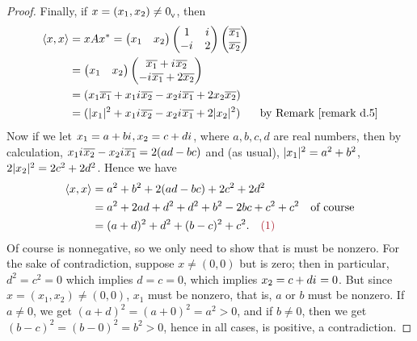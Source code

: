 \begin{proof}
Finally, if \(x = (x_1, x_2) \ne 0_{_{\textsf{V}}}\), then
\begin{align*}
    \LG x, x \RG & = x A x^*
        = \begin{pmatrix} x_1 & x_2 \end{pmatrix}
          \begin{pmatrix} 1 & \iu \\ -\iu & 2 \end{pmatrix}
          \begin{pmatrix} \conjugatet{x_1} \\ \conjugatet{x_2} \end{pmatrix} \\
        & = \begin{pmatrix} x_1 & x_2 \end{pmatrix}
            \begin{pmatrix} \conjugatet{x_1} + \iu \conjugatet{x_2} \\ -\iu \conjugatet{x_1} + 2\conjugatet{x_2} \end{pmatrix} \\
        & = (x_1 \conjugatet{x_1} + x_1 \iu \conjugatet{x_2} - x_2 \iu \conjugatet{x_1} + 2 x_2 \conjugatet{x_2}) \\
        & = (\abs{x_1}^2 + x_1 \iu \conjugatet{x_2} - x_2 \iu \conjugatet{x_1} + 2 \abs{x_2}^2) & \text{by \RMK{d.5}}
\end{align*}
Now if we let \(x_1 = a + b {i\mkern1mu}, x_2 = c + d {i\mkern1mu}\), where \(a, b, c, d\) are real numbers, then by calculation, \(x_1 {i\mkern1mu} \overline{x_2} - x_2 {i\mkern1mu} \overline{x_1} = 2(ad - bc)\) and (as usual), \(\lvert x_1\rvert^2 = a^2 + b^2\), \(2 \lvert x_2\rvert^2 = 2c^2 + 2d^2\).
Hence we have
\begin{align*}
    \LG x, x \RG & = a^2 + b^2 + 2(ad - bc) + 2c^2 + 2d^2 \\
        & = a^2 + 2ad + d^2 + d^2 + b^2 - 2bc + c^2 + c^2 & \text{of course} \\
        & = (a + d)^2 + d^2 + (b - c)^2 + c^2. \quad \MAROON{(1)}
\end{align*}
Of course  is nonnegative, so we only need to show that is must be nonzero.
For the sake of contradiction, suppose \(x \ne (0, 0)\) but  is zero;
then in particular, \(d^2 = c^2 = 0\) which implies \(d = c = 0\), which implies \(x_2 = c + d {i\mkern1mu} = 0\).
But since \(x = (x_1, x_2) \ne (0, 0)\), \(x_1\) must be nonzero, that is, \(a\) or \(b\) must be nonzero.
If \(a \ne 0\), we get \((a + d)^2 = (a + 0)^2 = a^2 > 0\), and if \(b \ne 0\), then we get \((b - c)^2 = (b - 0)^2 = b^2 > 0\), hence in all cases,  is positive, a contradiction.


\end{proof}
